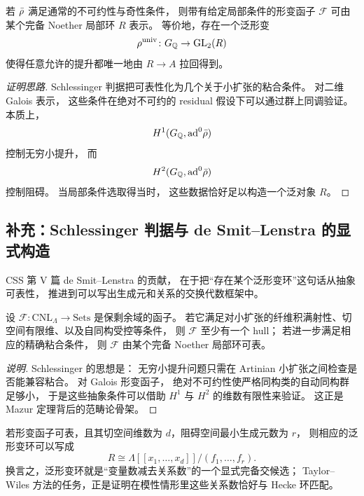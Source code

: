 \begin{theorem}
\label{thm:ch10-mazur}
若 $\bar{\rho}$ 满足通常的不可约性与奇性条件，
则带有给定局部条件的形变函子 $\mathcal F$ 可由某个完备 Noether 局部环 $R$ 表示。
等价地，存在一个泛形变
\[
  \rho^{\mathrm{univ}}\colon G_{\mathbb{Q}}\to \mathrm{GL}_2(R)
\]
使得任意允许的提升都唯一地由 $R\to A$ 拉回得到。
\end{theorem}

\begin{proof}[证明思路]
Schlessinger 判据把可表性化为几个关于小扩张的粘合条件。
对二维 Galois 表示，
这些条件在绝对不可约的 residual 假设下可以通过群上同调验证。
本质上，
\[
  H^1(G_{\mathbb{Q}},\mathrm{ad}^0\bar{\rho})
\]
控制无穷小提升，
而
\[
  H^2(G_{\mathbb{Q}},\mathrm{ad}^0\bar{\rho})
\]
控制阻碍。
当局部条件选取得当时，
这些数据恰好足以构造一个泛对象 $R$。
\end{proof}

\subsection*{补充：Schlessinger 判据与 de Smit--Lenstra 的显式构造}
CSS 第 V 篇 de Smit--Lenstra 的贡献，
在于把“存在某个泛形变环”这句话从抽象可表性，
推进到可以写出生成元和关系的交换代数框架中。

\begin{theorem}
\label{thm:ch10-schlessinger}
设 $\mathcal F\colon \mathrm{CNL}_\Lambda\to \mathrm{Sets}$ 是保剩余域的函子。
若它满足对小扩张的纤维积满射性、切空间有限维、以及自同构受控等条件，
则 $\mathcal F$ 至少有一个 hull；
若进一步满足相应的精确粘合条件，
则 $\mathcal F$ 由某个完备 Noether 局部环可表。
\end{theorem}

\begin{proof}[说明]
Schlessinger 的思想是：
无穷小提升问题只需在 Artinian 小扩张之间检查是否能兼容粘合。
对 Galois 形变函子，
绝对不可约性使严格同构类的自动同构群足够小，
于是这些抽象条件可以借助 $H^1$ 与 $H^2$ 的维数有限性来验证。
这正是 Mazur 定理背后的范畴论骨架。
\end{proof}

\begin{proposition}
\label{prop:ch10-desmit-lenstra}
若形变函子可表，且其切空间维数为 $d$，阻碍空间最小生成元数为 $r$，
则相应的泛形变环可以写成
\[
  R\cong \Lambda[[x_1,\dots,x_d]]/(f_1,\dots,f_r).
\]
换言之，泛形变环就是“变量数减去关系数”的一个显式完备交候选；
Taylor--Wiles 方法的任务，正是证明在模性情形里这些关系数恰好与 Hecke 环匹配。
\end{proposition}

